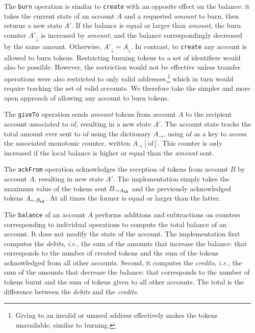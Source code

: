 \documentclass[9pt, oneside]{article}   	%
\begin{document}
The \texttt{burn} operation is similar to \texttt{create} with an opposite effect on the balance: it takes the current state of an account $A$ and a requested \textit{amount} to burn, then returns a new state $A'$. If the balance is equal or larger than \textit{amount}, the burn counter $A'_\downarrow$ is increased by \textit{amount}, and the balance correspondingly decreased by the same amount. Otherwise, $A'_\downarrow = A_\downarrow$. In contrast, to \texttt{create} any account is allowed to burn tokens. Restricting burning tokens to a set of identifiers would also be possible. However, the restriction would not be effective unless transfer operations were also restricted to only valid addresses,\footnote{Giving to an invalid or unused address effectively makes the tokens unavailable, similar to burning.} which in turn would require tracking the set of valid accounts. We therefore take the simpler and more open approach of allowing any account to burn tokens. 

The \texttt{giveTo} operation sends \textit{amount} tokens from account $A$ to the recipient account associated to $id$, resulting in a new state $A'$. The account state tracks the total amount ever sent to $id$ using the dictionary $A_{\rightarrow}$, using $id$ as a key to access the associated monotonic counter, written $A_{\rightarrow}[id]$. This counter is only increased if the local balance is higher or equal than the \textit{amount} sent.

The \texttt{ackFrom} operation acknowledges the reception of tokens from account $B$ by account $A$, resulting in new state $A'$. The implementation simply takes the maximum value of the tokens sent $B_{\rightarrow A_{\tiny \textbf{id}}}$ and the previously acknowledged tokens $A_{\leftarrow B_{\tiny \textbf{id}}}$. At all times the former is equal or larger than the latter.

The \texttt{balance} of an account $A$ performs additions and subtractions on counters corresponding to individual operations to compute the total balance of an account. It does not modify the state of the account. The implementation first computes the \textit{debits}, \textit{i.e.}, the sum of the amounts that increase the balance: that corresponds to the number of created tokens and the sum of the tokens acknowledged from all other accounts. Second, it computes the \textit{credits}, \textit{i.e.}, the sum of the amounts that decrease the balance: that corresponds to the number of tokens burnt and the sum of tokens given to all other accounts. The total is the difference between the \textit{debits} and the \textit{credits}.
\end{document}

